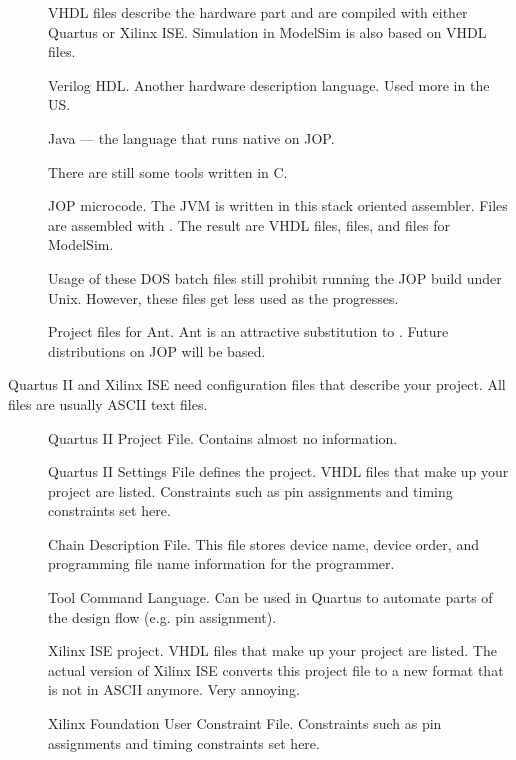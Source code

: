 \begin{description}

\item[] VHDL files describe the hardware part and are
compiled with either Quartus or Xilinx ISE. Simulation in ModelSim
is also based on VHDL files.
\item[] Verilog HDL. Another hardware description language.
Used more in the US.

\item[] Java --- the language that runs native on JOP.

\item[] There are still some tools written in C.

\item[] JOP microcode. The JVM is written in this stack
oriented assembler. Files are assembled with . The result
are VHDL files,  files, and  files for
ModelSim.

\item[] Usage of these DOS batch files still prohibit
running the JOP build under Unix. However, these files get less used
as the  progresses.

\item[] Project files for Ant. Ant is an attractive
substitution to . Future distributions on JOP will be
 based.

\end{description}


Quartus II and Xilinx ISE need configuration files that describe
your project. All files are usually ASCII text files.

\begin{description}

\item[] Quartus II Project File. Contains almost no
information.
\item[] Quartus II Settings File defines the project. VHDL
files that make up your project are listed. Constraints such as pin
assignments and timing constraints set here.
\item[] Chain Description File. This file
stores device name, device order, and programming file name
information for the programmer.
\item[] Tool Command Language. Can be used in Quartus to
automate parts of the design flow (e.g. pin assignment).

\item[] Xilinx ISE project. VHDL
files that make up your project are listed. The actual version of
Xilinx ISE converts this project file to a new format that is not in
ASCII anymore. Very annoying.
\item[] Xilinx Foundation User Constraint File. Constraints
such as pin assignments and timing constraints set here.

\end{description}

